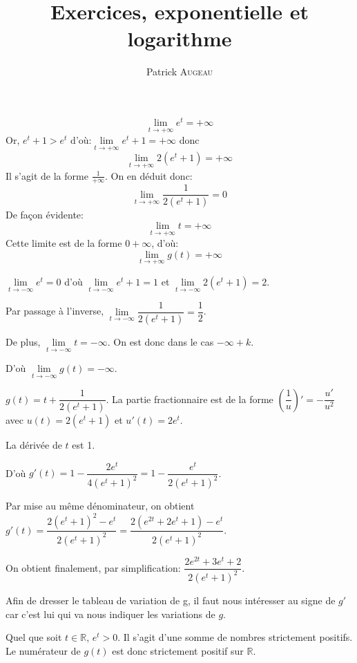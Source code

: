 \documentclass[a4paper,12pt]{scrartcl}
\title{Exercices, exponentielle et logarithme}
\author{Patrick \textsc{Augeau}}
\begin{document}
\maketitle


\exo{}



$$\lim_{t\to+\infty} e^t = +\infty$$
Or, $e^t + 1 > e^t$ d'où:$\lim\limits_{t\to+\infty} e^t+1 = +\infty$
donc
$$\lim_{t\to+\infty} 2(e^t+1) = +\infty$$
Il s'agit de la forme $\frac{1}{+\infty}$. 
On en déduit donc: 
$$\lim_{t\to+\infty} \dfrac{1}{2(e^t+1)} = 0$$
De façon évidente:
$$\lim_{t\to+\infty} t = +\infty$$
Cette limite est de la forme $0+\infty$, d'où:
$$\lim_{t\to+\infty} g(t) = +\infty$$


$\lim\limits_{t\to-\infty} e^t = 0$ d'où $\lim\limits_{t\to-\infty} e^t + 1 = 1$ et $\lim\limits_{t\to-\infty} 2(e^t + 1) = 2$.

Par passage à l'inverse, $\lim\limits_{t\to-\infty} \dfrac{1}{2(e^t + 1)} = \dfrac{1}{2}$.

De plus, $\lim\limits_{t\to-\infty} t = -\infty$. On est donc dans le cas $-\infty + k$. 

D'où $\lim\limits_{t\to-\infty} g(t) = -\infty$.

\question{}

$g(t) = t + \dfrac{1}{2(e^t+1)}$. La partie fractionnaire est de la forme $\left( \dfrac{1}{u} \right)' = -\dfrac{u'}{u^2}$ avec $u(t) = 2(e^t + 1)$ et $u'(t) = 2e^t$. 

La dérivée de $t$ est 1.

D'où $g'(t) = 1 - \dfrac{2e^t}{4(e^t+1)^2} = 1 - \dfrac{e^t}{2(e^t+1)^2}$.

Par mise au même dénominateur, on obtient $g'(t) = \dfrac{2(e^t+1)^2 - e^t}{2(e^t+1)^2} = \dfrac{2(e^{2t} + 2e^t + 1) - e^t}{2(e^t+1)^2}$.

On obtient finalement, par simplification: $\dfrac{2e^{2t} + 3e^t + 2}{2(e^t+1)^2}$.

\question{}

Afin de dresser le tableau de variation de g, il  faut nous intéresser au signe de $g'$ car c'est lui qui va nous indiquer les variations de $g$.


Quel que soit $t \in \mathbb{R}$, 
$e^t > 0$. Il s'agit d'une somme de nombres strictement positifs. Le numérateur de $g(t)$ est donc strictement positif sur $\mathbb{R}$.
\end{document}

